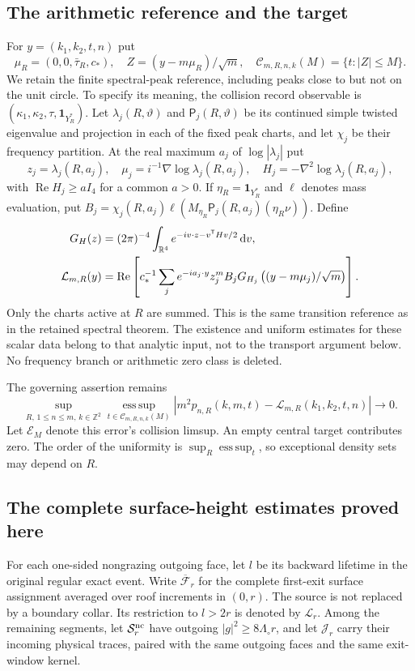 \documentclass[11pt,reqno]{amsart}
\numberwithin{equation}{section}
\theoremstyle{definition}
\theoremstyle{remark}\newtheorem{remark}[theorem]{Remark}
\newcommand{\R}{\mathbb R}\newcommand{\Z}{\mathbb Z}
\newcommand{\one}{\mathbf1}\newcommand{\dd}{\,\mathrm d}
\newcommand{\esssup}{\operatorname*{ess\,sup}}
\begin{document}
\subsection{The arithmetic reference and the target}
For $y=(k_1,k_2,t,n)$ put
\[
 \mu_R=(0,0,\bar\tau_R,c_*),\quad
 Z=(y-m\mu_R)/\sqrt m,\quad
 \mathcal C_{m,R,n,k}(M)=\{t:|Z|\le M\}.
\]
We retain the finite spectral-peak reference, including peaks close to
but not on the unit circle. To specify its meaning, the collision
record observable is $(\kappa_1,\kappa_2,\tau,\one_{Y_R^*})$.
Let $\lambda_j(R,\vartheta)$ and $\mathsf P_j(R,\vartheta)$ be its
continued simple twisted eigenvalue and projection in each of the
fixed peak charts, and let $\chi_j$ be their frequency partition.
At the real maximum $a_j$ of $\log|\lambda_j|$ put
\[
 z_j=\lambda_j(R,a_j),\quad
 \mu_j=i^{-1}\nabla\log\lambda_j(R,a_j),\quad
 H_j=-\nabla^2\log\lambda_j(R,a_j),
\]
with $\operatorname{Re}H_j\ge aI_4$ for a common $a>0$. If
$\eta_R=\one_{Y_R^*}$ and $\ell$ denotes mass evaluation, put
$B_j=\chi_j(R,a_j)\ell(M_{\eta_R}\mathsf P_j(R,a_j)(\eta_R\nu))$.
Define
\begin{align}
 G_H(z)&=(2\pi)^{-4}\int_{\R^4}e^{-iv\cdot z-v^{\mathsf T}Hv/2}\dd v,
 \notag\\
 \mathcal L_{m,R}(y)&=\operatorname{Re}\left[
 c_*^{-1}\sum_j e^{-ia_j\cdot y}z_j^m B_j
      G_{H_j}\left((y-m\mu_j)/\sqrt m\right)\right].
 \label{eq:v76-reference}
\end{align}
Only the charts active at $R$ are summed. This is the same transition
reference as in the retained spectral theorem. The existence and
uniform estimates for these scalar data belong to that analytic
input, not to the transport argument below. No frequency branch or
arithmetic zero class is deleted.

The governing assertion remains
\begin{equation}\label{eq:v76-target}
 \sup_{R,\,1\le n\le m,\,k\in\Z^2}
 \esssup_{t\in\mathcal C_{m,R,n,k}(M)}
 |m^2p_{n,R}(k,m,t)-\mathcal L_{m,R}(k_1,k_2,t,n)|\longrightarrow0.
\end{equation}
Let $\mathcal E_M$ denote this error's collision limsup. An empty
central target contributes zero. The order of the uniformity is
$\sup_R\esssup_t$, so exceptional density sets may depend on $R$.

\subsection{The complete surface-height estimates proved here}
For each one-sided nongrazing outgoing face, let $l$ be its backward
lifetime in the original regular exact event. Write
$\overline{\mathcal F}_r$ for the complete first-exit surface assignment
averaged over roof increments in $(0,r)$. The source is not replaced
by a boundary collar. Its restriction to $l>2r$ is denoted by
$\mathcal L_r$. Among the remaining segments, let
$\mathcal S_r^{\rm nc}$ have outgoing $|g|^2\ge8\Lambda_\circ r$,
and let $\mathcal J_r$ carry their incoming physical traces, paired
with the same outgoing faces and the same exit-window kernel.
\end{document}
